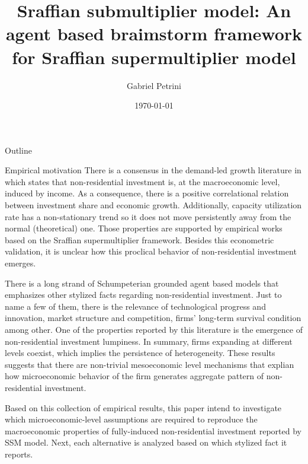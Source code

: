 \documentclass[presentation]{beamer}
\author{Gabriel Petrini}
\date{\today}
\title{Sraffian submultiplier model: An agent based braimstorm framework for Sraffian supermultiplier model}
\begin{document}
\maketitle
\begin{frame}{Outline}
\tableofcontents
\end{frame}


\begin{frame}[label={sec:orgcb33816}]{Empirical motivation}
There is a consensus in the demand-led growth literature in which states that non-residential investment is, at the macroeconomic level, induced by income.
As a consequence, there is a positive correlational relation between investment share and economic growth.
Additionally, capacity utilization rate has a non-stationary trend so it does not move persistently away from the normal (theoretical) one.
Those properties are supported by empirical works based on the Sraffian supermultiplier framework.
Besides this econometric validation, it is unclear how this proclical behavior of non-residential investment emerges.

There is a long strand of Schumpeterian grounded agent based models that emphasizes other stylized facts regarding non-residential investment.
Just to name a few of them, there is the relevance of technological progress and innovation, market structure and competition, firms' long-term survival condition among other.
One of the properties reported by this literature is the emergence of non-residential investment lumpiness.
In summary, firms expanding at different levels coexist, which implies the persistence of heterogeneity.
These results suggests that there are non-trivial mesoeconomic level mechanisms that explian how microeconomic behavior of the firm generates aggregate pattern of non-residential investment.

Based on this collection of empirical results, this paper intend to investigate which microeconomic-level assumptions are required to reproduce the macroeconomic properties of fully-induced non-residential investment reported by SSM model.
Next, each alternative is analyzed based on which stylized fact it reports.
\end{frame}
\end{document}
